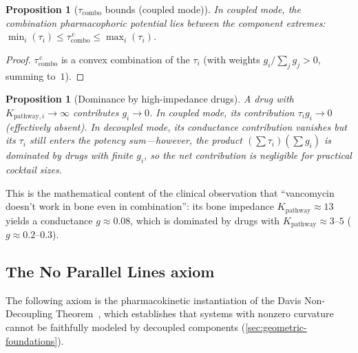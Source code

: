 \documentclass[11pt]{article}
\theoremstyle{plain}
\newtheorem{proposition}[theorem]{Proposition}
\theoremstyle{definition}
\newcommand{\Kpath}{K_{\mathrm{pathway}}}
\begin{document}
\begin{proposition}[$\tau_{\mathrm{combo}}$ bounds (coupled mode)]
\label{prop:tau-bounds}
In coupled mode, the combination pharmacophoric potential lies between
the component extremes:
$\min_i(\tau_i) \leq \tau_{\mathrm{combo}}^{\,\mathrm{c}}
\leq \max_i(\tau_i)$.
\end{proposition}

\begin{proof}
$\tau_{\mathrm{combo}}^{\,\mathrm{c}}$ is a convex combination of
the $\tau_i$ (with weights $g_i / \sum_j g_j > 0$, summing to~$1$).
\end{proof}

\begin{proposition}[Dominance by high-impedance drugs]
\label{prop:dominance}
A drug with $K_{\mathrm{pathway},i} \to \infty$ contributes
$g_i \to 0$. In coupled mode, its contribution $\tau_i g_i \to 0$
(effectively absent). In decoupled mode, its conductance
contribution vanishes but its $\tau_i$ still enters the potency
sum---however, the product $(\sum \tau_i)(\sum g_i)$ is dominated
by drugs with finite $g_i$, so the net contribution is negligible
for practical cocktail sizes.
\end{proposition}

This is the mathematical content of the clinical observation that
``vancomycin doesn't work in bone even in combination'': its bone
impedance $\Kpath \approx 13$ yields a conductance $g \approx 0.08$,
which is dominated by drugs with $\Kpath \approx 3$--$5$
($g \approx 0.2$--$0.3$).

\subsection{The No Parallel Lines axiom}
\label{sec:no-parallel-lines}

The following axiom is the pharmacokinetic instantiation of
the Davis Non-Decoupling Theorem~\cite{DavisNonDecoupling},
which establishes that systems with nonzero curvature cannot
be faithfully modeled by decoupled components
(\cref{sec:geometric-foundations}).
\end{document}
